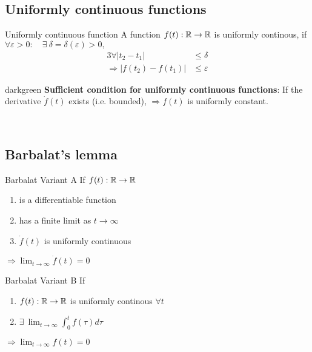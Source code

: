 \subsection{Uniformly continuous functions}
\label{ch:uniform-continuous}
\begin{definition}{Uniformly continuous function}
A function $f(t): \mathbb{R} \rightarrow \mathbb{R}$ 
is uniformly continous, if\\
$\forall \varepsilon>0:
    \quad \exists~ \delta = \delta(\varepsilon) >0,$
\begin{alignat*}{3}
\forall |t_2 - t_1| &\leq \delta\\
\Rightarrow |  f(t_2) - f(t_1) | &\leq \varepsilon
\end{alignat*}
\end{definition}

\begin{conclusion}{darkgreen}
\textbf{Sufficient condition for uniformly continuous functions}:
If the derivative $\dot{f}(t)$ exists (i.e. bounded),
$\Rightarrow f(t)$ is uniformly constant.
\end{conclusion}~

\subsection{Barbalat's lemma}
\label{ch:barbalat}
\begin{lemma}{Barbalat Variant A}
If $f(t): \mathbb{R} \rightarrow \mathbb{R}$
\begin{enumerate}
\item is a differentiable function
\item has a finite limit as $t \rightarrow \infty$ 
\item $\dot{f}(t)$ is uniformly continuous
\end{enumerate}
$\Rightarrow \lim_{t \rightarrow \infty} \dot{f}(t) = 0$\\
\end{lemma}

\begin{lemma}{Barbalat Variant B}
If
\begin{enumerate}
\item $f(t): \mathbb{R} \rightarrow \mathbb{R}$ is uniformly continous $\forall t$
\item $\exists~ \lim_{t \rightarrow \infty} \int_0^t f(\tau) d\tau$
\end{enumerate}
$\Rightarrow \lim_{t \rightarrow \infty} f(t) = 0$\\
\end{lemma}

